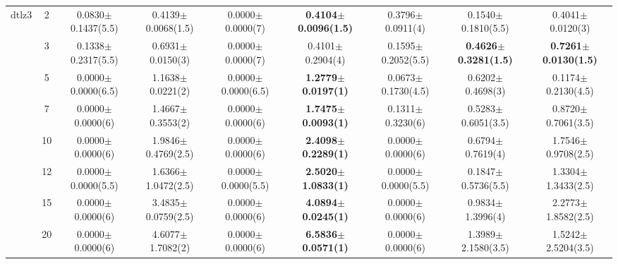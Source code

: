 \begin{table*}[htbp]
\begin{adjustbox}{width=1.0\textwidth,center}
\begin{tabular}{ccccccccc}
dtlz3 & 2          & 0.0830$\pm$0.1437(5.5) & 0.4139$\pm$0.0068(1.5)          & 0.0000$\pm$0.0000(7)   & \textbf{0.4104$\pm$0.0096(1.5)}  & 0.3796$\pm$0.0911(4)            & 0.1540$\pm$0.1810(5.5)          & 0.4041$\pm$0.0120(3)            \\
      & 3          & 0.1338$\pm$0.2317(5.5) & 0.6931$\pm$0.0150(3)            & 0.0000$\pm$0.0000(7)   & 0.4101$\pm$0.2904(4)             & 0.1595$\pm$0.2052(5.5)          & \textbf{0.4626$\pm$0.3281(1.5)} & \textbf{0.7261$\pm$0.0130(1.5)} \\
      & 5          & 0.0000$\pm$0.0000(6.5) & 1.1638$\pm$0.0221(2)            & 0.0000$\pm$0.0000(6.5) & \textbf{1.2779$\pm$0.0197(1)}    & 0.0673$\pm$0.1730(4.5)          & 0.6202$\pm$0.4698(3)            & 0.1174$\pm$0.2130(4.5)          \\
      & 7          & 0.0000$\pm$0.0000(6)   & 1.4667$\pm$0.3553(2)            & 0.0000$\pm$0.0000(6)   & \textbf{1.7475$\pm$0.0093(1)}    & 0.1311$\pm$0.3230(6)            & 0.5283$\pm$0.6051(3.5)          & 0.8720$\pm$0.7061(3.5)          \\
      & 10         & 0.0000$\pm$0.0000(6)   & 1.9846$\pm$0.4769(2.5)          & 0.0000$\pm$0.0000(6)   & \textbf{2.4098$\pm$0.2289(1)}    & 0.0000$\pm$0.0000(6)            & 0.6794$\pm$0.7619(4)            & 1.7546$\pm$0.9708(2.5)          \\
      & 12         & 0.0000$\pm$0.0000(5.5) & 1.6366$\pm$1.0472(2.5)          & 0.0000$\pm$0.0000(5.5) & \textbf{2.5020$\pm$1.0833(1)}    & 0.0000$\pm$0.0000(5.5)          & 0.1847$\pm$0.5736(5.5)          & 1.3304$\pm$1.3433(2.5)          \\
      & 15         & 0.0000$\pm$0.0000(6)   & 3.4835$\pm$0.0759(2.5)          & 0.0000$\pm$0.0000(6)   & \textbf{4.0894$\pm$0.0245(1)}    & 0.0000$\pm$0.0000(6)            & 0.9834$\pm$1.3996(4)            & 2.2773$\pm$1.8582(2.5)          \\
      & 20         & 0.0000$\pm$0.0000(6)   & 4.6077$\pm$1.7082(2)            & 0.0000$\pm$0.0000(6)   & \textbf{6.5836$\pm$0.0571(1)}    & 0.0000$\pm$0.0000(6)            & 1.3989$\pm$2.1580(3.5)          & 1.5242$\pm$2.5204(3.5)          \\

\end{tabular}
\end{adjustbox}
\end{table*}
